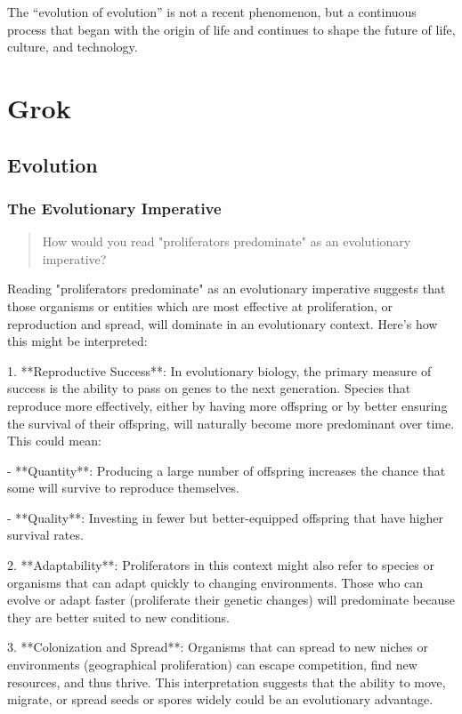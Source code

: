 \documentclass[10pt,titlepage]{book}
\begin{document}
The ``evolution of evolution'' is not a recent phenomenon, but a continuous process that began with the origin of life and continues to shape the future of life, culture, and technology.


\part{Grok}

\chapter{Evolution}

\section{The Evolutionary Imperative}
\begin{quote}How would you read "proliferators predominate" as an evolutionary imperative?
\end{quote}


Reading "proliferators predominate" as an evolutionary imperative suggests that those organisms or entities which are most effective at proliferation, or reproduction and spread, will dominate in an evolutionary context. Here's how this might be interpreted:

1. **Reproductive Success**: In evolutionary biology, the primary measure of success is the ability to pass on genes to the next generation. Species that reproduce more effectively, either by having more offspring or by better ensuring the survival of their offspring, will naturally become more predominant over time. This could mean:

   - **Quantity**: Producing a large number of offspring increases the chance that some will survive to reproduce themselves.
   
   - **Quality**: Investing in fewer but better-equipped offspring that have higher survival rates.

2. **Adaptability**: Proliferators in this context might also refer to species or organisms that can adapt quickly to changing environments. Those who can evolve or adapt faster (proliferate their genetic changes) will predominate because they are better suited to new conditions.

3. **Colonization and Spread**: Organisms that can spread to new niches or environments (geographical proliferation) can escape competition, find new resources, and thus thrive. This interpretation suggests that the ability to move, migrate, or spread seeds or spores widely could be an evolutionary advantage.
\end{document}
